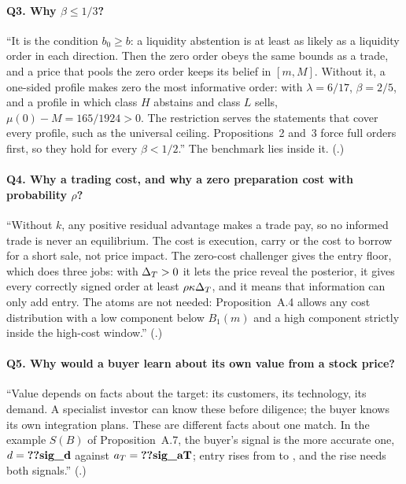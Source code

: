 \paragraph{Q3. Why \texorpdfstring{\(\beta\le1/3\)}{beta <= 1/3}?}
``It is the condition \(b_0\ge b\): a liquidity abstention is at least as likely as a liquidity order in each
direction. Then the zero order obeys the same bounds as a trade, and a price that pools the zero order keeps its
belief in \([m,M]\). Without it, a one-sided profile makes zero the most informative order: with \(\lambda=6/17\),
\(\beta=2/5\), and a profile in which class \(H\) abstains and class \(L\) sells, \(\mu(0)-M=165/1924>0\). The restriction serves the
statements that cover every profile, such as the universal ceiling. Propositions~2 and~3 force full orders first, so
they hold for every \(\beta<1/2\).'' The benchmark lies  inside it.
(.)

\paragraph{Q4. Why a trading cost, and why a zero preparation cost with probability \texorpdfstring{\(\rho\)}{rho}?}
``Without \(k\), any positive residual advantage makes a trade pay, so no informed trade is never an equilibrium. The
cost is execution, carry or the cost to borrow for a short sale, not price impact. The zero-cost challenger gives the
entry floor, which does three jobs: with \(\Delta_T>0\) it lets the price reveal the posterior, it gives every correctly
signed order at least \(\rho\kappa\Delta_T\), and it means that information can only add entry. The atoms are not needed:
Proposition~A.4 allows any cost distribution with a low component below \(B_1(m)\) and a high component strictly inside the
high-cost window.'' (.)

\paragraph{Q5. Why would a buyer learn about its own value from a stock price?}
``Value depends on facts about the target: its customers, its technology, its demand. A specialist investor can know
these before diligence; the buyer knows its own integration plans. These are different facts about one match. In
the example \(S(B)\) of Proposition~A.7, the buyer's signal is the more accurate one, \(d=\reg{sig_d}\) against
\(a_T=\reg{sig_aT}\); entry rises from  to , and the rise needs
both signals.'' (.)

